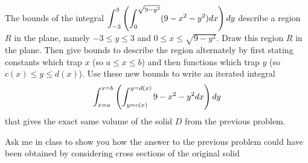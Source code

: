 \begin{problem}
 The bounds of the integral $\displaystyle\int_{-3}^{3} \left(\int_0^{\sqrt{9-y^2}}(9-x^2-y^2) dx\right) dy$ describe a region $R$ in the plane, namely $-3\leq y\leq 3$ and $0\leq x\leq \sqrt{9-y^2}$.  Draw this region $R$ in the plane. Then give bounds to describe the region alternately by first stating constants which trap $x$ (so $a\leq x\leq b$) and then functions which trap $y$ (so $c(x)\leq y \leq d(x)$). Use these new bounds to write an iterated integral 
 $$\displaystyle\int_{x=a}^{x=b} \left(\int_{y=c(x)}^{y=d(x)}9-x^2-y^2 dx\right) dy$$   
 that gives the exact same volume of the solid $D$ from the previous problem.
\end{problem}

Ask me in class to show you how the answer to the previous problem could have been obtained by considering cross sections of the original solid

